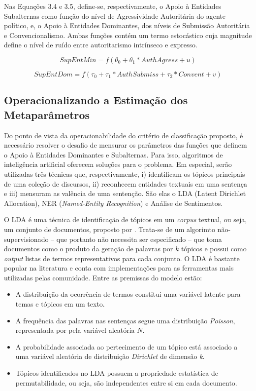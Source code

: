 \documentclass[
12pt,				%
openright,			%
twoside,			%
a4paper,			%
english,			%
french,				%
spanish,			%
brazil				%
]{abntex2}
\begin{document}
Nas Equações 3.4 e 3.5, define-se, respectivamente, o Apoio à Entidades Subalternas como função do nível de Agressividade Autoritária do agente político, e, o Apoio à Entidades Dominantes, dos níveis de Submissão Autoritária e Convencionalismo. Ambas funções contém um termo estocástico cuja magnitude define o nível de ruído entre autoritarismo intrínseco e expresso.

\begin{equation}
SupEntMin = f(\theta_0 + \theta_1 * AuthAgress + u)
\end{equation}

\begin{equation}
SupEntDom = f(\tau_0 + \tau_1 * AuthSubmiss + \tau_2 * Convent + v)
\end{equation}

\subsection{Operacionalizando a Estimação dos Metaparâmetros}

Do ponto de vista da operacionabilidade do critério de classificação proposto, é necessário resolver o desafio de mensurar os parâmetros das funções que definem o Apoio à Entidades Dominantes e Subalternas. Para isso, algoritmos de inteligência artificial oferecem soluções para o problema. Em especial, serão utilizadas três técnicas que, respectivamente, i) identificam os tópicos principais de uma coleção de discursos, ii) reconhecem entidades textuais em uma sentença e iii) mensuram as valência de uma sentenção. São elas o LDA (Latent Dirichlet Allocation), NER (\emph{Named-Entity Recognition}) e Análise de Sentimentos.   
	
O LDA é uma técnica de identificação de tópicos em um \emph{corpus} textual, ou seja, um conjunto de documentos, proposto por . Trata-se de um algorimto não-supervisionado -- que portanto não necessita ser especificado -- que toma documentos como o produto da geração de palavras por $k$ tópicos e possui como \emph{output} listas de termos representativos para cada conjunto. O LDA é bastante popular na literatura e conta com implementações para as ferramentas mais utilizadas pelas comunidade. Entre as premissas do modelo estão:

\begin{itemize}
	\item A distribuição da ocorrência de termos constitui uma variável latente para temas e tópicos em um texto.
	\item A frequência das palavras nas sentenças segue uma distribuição \emph{Poisson}, representada por pela variável aleatória $N$.
	\item A probabilidade associada ao pertecimento de um tópico está associado a uma variável aleatória de distribuição \emph{Dirichlet} de dimensão \emph{k}.
	\item Tópicos identificados no LDA possuem a propriedade estatística de permutabilidade, ou seja, são independentes entre si em cada documento. 
\end{itemize}
\end{document}
